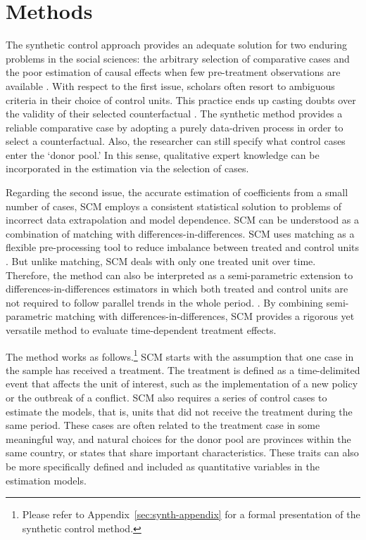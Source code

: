 \section{Methods}
\label{sec:methods}

The synthetic control approach provides an adequate solution for two enduring problems in the social sciences: the arbitrary selection of comparative cases and the poor estimation of causal effects when few pre-treatment observations are available \citep{abadie2003, abadie2010}. With respect to the first issue, scholars often resort to ambiguous criteria in their choice of control units. This practice ends up casting doubts over the validity of their selected counterfactual \citep{abadie2011}. The synthetic method provides a reliable comparative case by adopting a purely data-driven process in order to select a counterfactual. Also, the researcher can still specify what control cases enter the `donor pool.' In this sense, qualitative expert knowledge can be incorporated in the estimation via the selection of cases. 

Regarding the second issue, the accurate estimation of coefficients from a small number of cases, SCM employs a consistent statistical solution to problems of incorrect data extrapolation and model dependence. SCM can be understood as a combination of matching with differences-in-differences. SCM uses matching as a flexible pre-processing tool to reduce imbalance between treated and control units \citep{ho2007matching, rubin1973matching, rubin2006matched}. But unlike matching, SCM deals with only one treated unit over time. Therefore, the method can also be interpreted as a semi-parametric extension to differences-in-differences estimators in which both treated and control units are not required to follow parallel trends in the whole period. \citep{abadie2005semiparametric}. By combining semi-parametric matching with differences-in-differences, SCM provides a rigorous yet versatile method to evaluate time-dependent treatment effects. 

The method works as follows.\footnote{Please refer to Appendix~\ref{sec:synth-appendix} for a formal presentation of the synthetic control method.} SCM starts with the assumption that one case in the sample has received a treatment. The treatment is defined as a time-delimited event that affects the unit of interest, such as the implementation of a new policy or the outbreak of a conflict. SCM also requires a series of control cases to estimate the models, that is, units that did not receive the treatment during the same period. These cases are often related to the treatment case in some meaningful way, and natural choices for the donor pool are provinces within the same country, or states that share important characteristics. These traits can also be more specifically defined and included as quantitative variables in the estimation models. 

